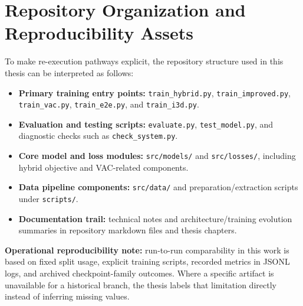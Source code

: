 \section{Repository Organization and Reproducibility Assets}

To make re-execution pathways explicit, the repository structure used in this thesis can be interpreted as follows:
\begin{itemize}
    \item \textbf{Primary training entry points:} \texttt{train\_hybrid.py}, \texttt{train\_improved.py}, \texttt{train\_vac.py}, \texttt{train\_e2e.py}, and \texttt{train\_i3d.py}.
    \item \textbf{Evaluation and testing scripts:} \texttt{evaluate.py}, \texttt{test\_model.py}, and diagnostic checks such as \texttt{check\_system.py}.
    \item \textbf{Core model and loss modules:} \texttt{src/models/} and \texttt{src/losses/}, including hybrid objective and VAC-related components.
    \item \textbf{Data pipeline components:} \texttt{src/data/} and preparation/extraction scripts under \texttt{scripts/}.
    \item \textbf{Documentation trail:} technical notes and architecture/training evolution summaries in repository markdown files and thesis chapters.
\end{itemize}

\noindent \textbf{Operational reproducibility note:} run-to-run comparability in this work is based on fixed split usage, explicit training scripts, recorded metrics in JSONL logs, and archived checkpoint-family outcomes. Where a specific artifact is unavailable for a historical branch, the thesis labels that limitation directly instead of inferring missing values.
